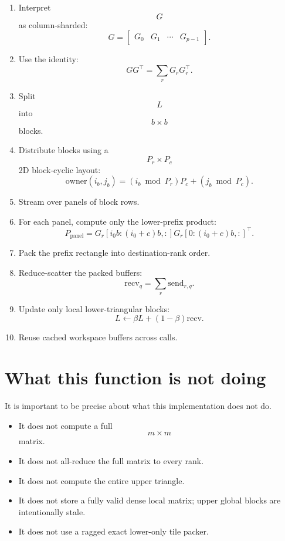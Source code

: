 \documentclass[11pt]{article}
\begin{document}
\begin{enumerate}
    \item Interpret $$G$$ as column-sharded:
    $$
    G =
    \begin{bmatrix}
    G_0 & G_1 & \cdots & G_{p-1}
    \end{bmatrix}.
    $$

    \item Use the identity:
    $$
    GG^\top = \sum_r G_rG_r^\top.
    $$

    \item Split $$L$$ into $$b \times b$$ blocks.

    \item Distribute blocks using a $$P_r \times P_c$$ 2D block-cyclic layout:
    $$
    \text{owner}(i_b,j_b)
    =
    (i_b \bmod P_r)P_c
    +
    (j_b \bmod P_c).
    $$

    \item Stream over panels of block rows.

    \item For each panel, compute only the lower-prefix product:
    $$
    P_{\text{panel}}
    =
    G_r[i_0b:(i_0+c)b,:]
    G_r[0:(i_0+c)b,:]^\top.
    $$

    \item Pack the prefix rectangle into destination-rank order.

    \item Reduce-scatter the packed buffers:
    $$
    \text{recv}_q
    =
    \sum_r
    \text{send}_{r,q}.
    $$

    \item Update only local lower-triangular blocks:
    $$
    L \leftarrow \beta L + (1-\beta)\text{recv}.
    $$

    \item Reuse cached workspace buffers across calls.
\end{enumerate}

\section{What this function is not doing}

It is important to be precise about what this implementation does not do.

\begin{itemize}[leftmargin=1.5em]
    \item It does not compute a full $$m \times m$$ matrix.
    \item It does not all-reduce the full matrix to every rank.
    \item It does not compute the entire upper triangle.
    \item It does not store a fully valid dense local matrix; upper global blocks are intentionally stale.
    \item It does not use a ragged exact lower-only tile packer.
\end{itemize}
\end{document}
